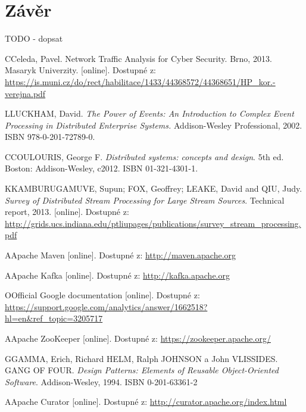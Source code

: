 \documentclass[
  digital, %
  table,   %
  nolof,     %
  nolot,     %
  oneside, %
  nocover,
  monochrome,
  12pt
]{fithesis3}
\begin{document}
\chapter{Závěr}
TODO - dopsat



\begin{thebibliography}{99}
\bibitem
CCeleda, Pavel. Network Traffic Analysis for Cyber Security. Brno, 2013. Masaryk Univerzity. [online]. Dostupné z: \url{https://is.muni.cz/do/rect/habilitace/1433/44368572/44368651/HP_kor.-verejna.pdf} \label{bib_celeda}

\bibitem
LLUCKHAM, David. \textit{The Power of Events: An Introduction to Complex
Event Processing in Distributed Enterprise Systems.} Addison-Wesley Professional, 2002. ISBN 978-0-201-72789-0. \label{bib_1}

\bibitem
CCOULOURIS, George F. \textit{Distributed systems: concepts and design}. 5th ed. Boston: Addison-Wesley, c2012. ISBN 01-321-4301-1. \label{bib_2}

\bibitem
KKAMBURUGAMUVE, Supun; FOX, Geoffrey; LEAKE, David and QIU, Judy. \textit{Survey of Distributed Stream Processing for Large Stream Sources}. Technical report, 2013. [online]. Dostupné z: \url{http://grids.ucs.indiana.edu/ptliupages/publications/survey_stream_processing.pdf} \label{bib_3}

\bibitem
AApache Maven [online]. Dostupné z: \url{http://maven.apache.org} \label{bib_4}

\bibitem
AApache Kafka [online]. Dostupné z: \url{http://kafka.apache.org} \label{bib_5}

\bibitem
OOfficial Google documentation  [online]. Dostupné z: \url{https://support.google.com/analytics/answer/1662518?hl=en&ref_topic=3205717} \label{bib_6}

\bibitem
AApache ZooKeeper [online]. Dostupné z: \url{https://zookeeper.apache.org/} \label{bib_7}

\bibitem
GGAMMA, Erich, Richard HELM, Ralph JOHNSON a John VLISSIDES. GANG OF FOUR. \textit{Design Patterns: Elements of Reusable Object-Oriented Software}. Addison-Wesley, 1994. ISBN 0-201-63361-2 \label{bib_8}

\bibitem
AApache Curator [online]. Dostupné z: \url{http://curator.apache.org/index.html} \label{bib_9}


\end{thebibliography}
\end{document}
